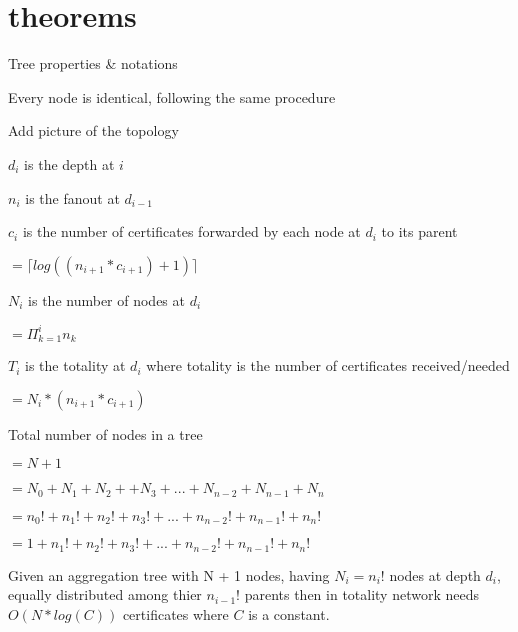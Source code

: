 \chapter{theorems}
Tree properties \& notations

Every node is identical, following the same procedure

Add picture of the topology

$d_{i}$ is the depth at $i$

$n_{i}$ is the fanout at $d_{i-1}$

$c_{i}$ is the number of certificates forwarded by each node at $d_{i}$ to its parent
 												
 												$= \lceil log((n_{i+1} * c_{i+1}) + 1) \rceil$

$N_{i}$ is the number of nodes at $d_{i}$  

												$= \Pi_{k=1}^i n_k$

$T_{i}$ is the totality at $d_{i}$ where totality is the number of certificates received/needed
											
												$= N_{i} * (n_{i+1} * c_{i+1})$

Total number of nodes in a tree  
												
												$= N + 1$
												
												$= N_{0} + N_{1} + N_{2} + + N_{3} + ... + N_{n-2} + N_{n-1} + N_{n}$
												
												$= n_{0}! + n_{1}! + n_{2}! + n_{3}! + ...	+ n_{n-2}!  + n_{n-1}! + n_{n}!$
												
												$= 1 + n_{1}! + n_{2}! + n_{3}! + ...	+ n_{n-2}!  + n_{n-1}! + n_{n}!$

\begin{theorem}
	Given an aggregation tree with N + 1 nodes, having $N_{i} = n_{i}!$ nodes at depth $d_{i}$, equally distributed among thier $n_{i-1}!$ parents then in totality network needs $O(N*log(C))$ certificates where $C$ is a constant.
\end{theorem}


